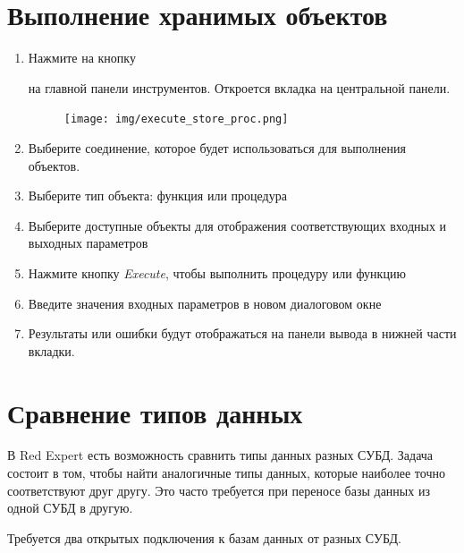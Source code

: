 \newpage
\section{Выполнение хранимых объектов}\label{sec:execute_proc}

\begin{enumerate}[leftmargin=20pt]
	\item Нажмите на кнопку  на главной панели инструментов. Откроется вкладка на центральной панели.
	\begin{figure}[H]
		\centering
		\texttt{[image: img/execute\_store\_proc.png]}
	\end{figure}
	
	\item Выберите соединение, которое будет использоваться для выполнения объектов.
	\item Выберите тип объекта: функция или процедура
	\item Выберите доступные объекты для отображения соответствующих входных и выходных параметров
	\item Нажмите кнопку \textit{Execute}, чтобы выполнить процедуру или функцию
	\item Введите значения входных параметров в новом диалоговом окне
	\item Результаты или ошибки будут отображаться на панели вывода в нижней части вкладки.
\end{enumerate}

\newpage

\section{Сравнение типов данных}\label{sec:compare_datatype}

В Red Expert есть возможность сравнить типы данных разных СУБД. Задача состоит в том, чтобы найти аналогичные типы данных, которые наиболее точно соответствуют друг другу. Это часто требуется при переносе базы данных из одной СУБД в другую.

Требуется два открытых подключения к базам данных от разных СУБД.

